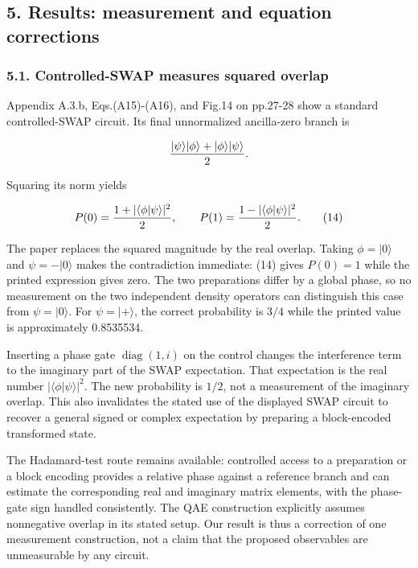 \subsection{5. Results: measurement and equation
corrections}\label{results-measurement-and-equation-corrections}

\subsubsection{5.1. Controlled-SWAP measures squared
overlap}\label{controlled-swap-measures-squared-overlap}

Appendix A.3.b, Eqs.(A15)-(A16), and Fig.14 on pp.27-28 show a standard
controlled-SWAP circuit. Its final unnormalized ancilla-zero branch is

\[
{ |\psi\rangle|\phi\rangle+|\phi\rangle|\psi\rangle\over2}.
\]

Squaring its norm yields

\[
P(0)={1+|\langle\phi|\psi\rangle|^2\over2},\qquad
P(1)={1-|\langle\phi|\psi\rangle|^2\over2}. \tag{14}
\]

The paper replaces the squared magnitude by the real overlap. Taking
\(\phi=|0\rangle\) and \(\psi=-|0\rangle\) makes the contradiction
immediate: (14) gives \(P(0)=1\) while the printed expression gives
zero. The two preparations differ by a global phase, so no measurement
on the two independent density operators can distinguish this case from
\(\psi=|0\rangle\). For \(\psi=|+\rangle\), the correct probability is
\(3/4\) while the printed value is approximately 0.8535534.

Inserting a phase gate \(\operatorname{diag}(1,i)\) on the control
changes the interference term to the imaginary part of the SWAP
expectation. That expectation is the real number
\(|\langle\phi|\psi\rangle|^2\). The new probability is \(1/2\), not a
measurement of the imaginary overlap. This also invalidates the stated
use of the displayed SWAP circuit to recover a general signed or complex
expectation by preparing a block-encoded transformed state.

The Hadamard-test route remains available: controlled access to a
preparation or a block encoding provides a relative phase against a
reference branch and can estimate the corresponding real and imaginary
matrix elements, with the phase-gate sign handled consistently. The QAE
construction explicitly assumes nonnegative overlap in its stated setup.
Our result is thus a correction of one measurement construction, not a
claim that the proposed observables are unmeasurable by any circuit.

